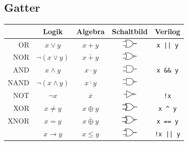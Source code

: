 	\begin{multicols}{2}
	\subsection{Gatter}
		\renewcommand{\arraystretch}{1.5}
		\begin{tabular}{r  || c c c c}
			               &   Logik      &   Algebra                 &   Schaltbild  & Verilog   \\ \hline\hline
		OR		        &   $x \lor y$          &   $x + y$                 
										&   \includegraphics[height = 11pt]{images/gatter/or}    &     \verb+x || y+       \\
		NOR	    &   $\lnot(x \lor y)$    &   $\overline{x + y}$      
										&   \includegraphics[height = 11pt]{images/gatter/nor}    &                       \\\hline
		AND	         &   $x \land y$        &   $x \cdot y$             
										&   \includegraphics[height = 11pt]{images/gatter/and}    &     \verb+x && y+         \\
		NAND	    &   $\lnot(x \land y)$  &   $\overline{x \cdot y}$  
										&   \includegraphics[height = 11pt]{images/gatter/nand}    &                     \\\hline
		NOT	          &   $\lnot x$            &   $\overline{x}$          
										&   \includegraphics[height = 11pt]{images/gatter/not}    &     \verb+!x+         \\\hline
		XOR	    &   $x \ne y$           &   $x \oplus y$            
										&   \includegraphics[height = 11pt]{images/gatter/xor}    &     \verb+x ^ y+             \\\hline
		XNOR	        &   $x = y$             &   $\overline{x \oplus y}$ 
										&   \includegraphics[height = 11pt]{images/gatter/xnor}    &     \verb+x == y+       \\\hline
			       &   $x \to y$           &   $x \le y$        
										&   \includegraphics[height = 11pt]{images/gatter/implies}    &   \verb+!x || y+       \\
		\end{tabular}
	

\end{multicols}
